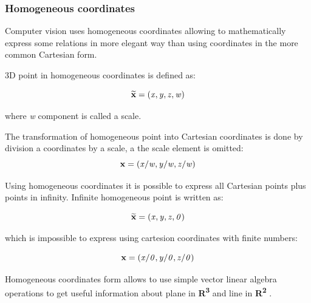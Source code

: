 \documentclass[a4paper,12pt]{article}
\newcommand{\evect}[1]{
{\bf #1}
}
\newcommand{\ehvect}[1]{
{\bf \widetilde{#1}}
}
\newcommand{\escal}[1]{
{\it #1}
}
\newcommand{\eucl}[1]{
{\bf R\textsuperscript{#1}}
}
\begin{document}

\subsubsection{Homogeneous coordinates}


Computer vision uses homogeneous coordinates allowing to mathematically express some relations
 in more elegant way than using coordinates in the more common Cartesian form. 

3D point in homogeneous coordinates is defined as:

\begin{equation}
\ehvect{x} = (\escal{x}, \escal{y}, \escal{z}, \escal{w})
\end{equation}

where \escal{w} component is called a scale.

The transformation of homogeneous point into Cartesian coordinates is done by division 
a coordinates by a scale, a the scale element is omitted:
\begin{equation}
\evect{x} = (\escal{x} / \escal{w}, \escal{y} / \escal{w}, \escal{z} / \escal{w})
\end{equation}

Using homogeneous coordinates it is possible to express all Cartesian points plus points in infinity.
Infinite homogeneous point is written as: 

\begin{equation}
\ehvect{x} = (\escal{x}, \escal{y}, \escal{z}, \escal{0})
\end{equation}

which is impossible to express using cartesion coordinates with finite numbers:

\begin{equation}
\evect{x} = (\escal{x} / \escal{0}, \escal{y} / \escal{0}, \escal{z} / \escal{0})
\end{equation}


Homogeneous coordinates form allows to 
use simple vector linear algebra operations 
to get useful information about plane in \eucl{3} and line in \eucl{2}.
\end{document}
